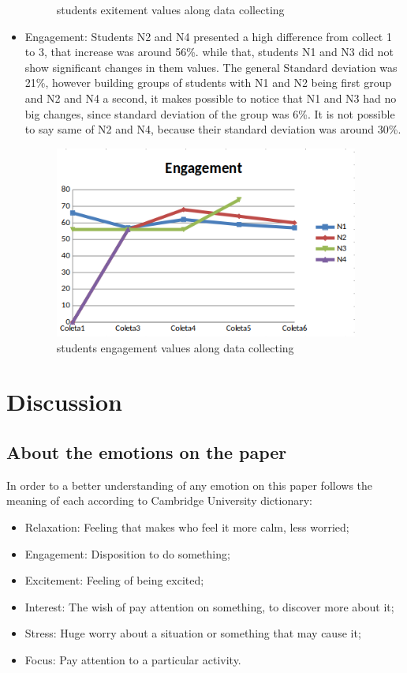 \documentclass[12pt,openright,a4paper]{article}
\begin{document}
\begin{itemize}
\begin{figure}[H]
 	     	\caption{students exitement values along data collecting}
 	     \end{figure}
 	\item Engagement: Students N2 and N4 presented a high difference from collect 1 to 3, that increase was around 56\%. while that, students N1 and N3 did not show significant changes in them values. The general Standard deviation was 21\%, however building groups of students with N1 and N2 being first group and N2 and N4 a second, it makes possible to notice that N1 and N3 had no big changes, since standard deviation of the group was 6\%. It is not possible to say same of N2 and N4, because their standard deviation was around 30\%.       
 	    \begin{figure}[H]
 	   	\centering
 	   	\includegraphics[width=10cm]{./engagement.png}
 	   	\caption{students engagement values along data collecting}
 	   \end{figure}
 \end{itemize}
\newpage
\section{Discussion}
\subsection{About the emotions on the paper}
In order to a better understanding of any emotion on this paper follows the meaning of each according to Cambridge University dictionary:
\begin{itemize}
	\item Relaxation: Feeling that makes who feel it more calm, less worried;
	\item Engagement: Disposition to do something;
	\item Excitement: Feeling of being excited;
	\item Interest: The wish of pay attention on something, to discover more about it;
	\item Stress: Huge worry about a situation or something that may cause it;
	\item Focus: Pay attention to a particular activity.
\end{itemize}
\end{document}
